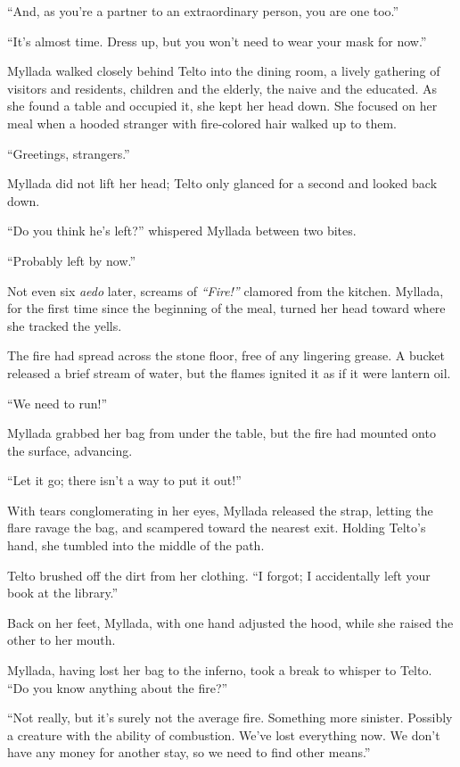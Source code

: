 ``And, as you're a partner to an extraordinary person, you are one too.''

``It's almost time. Dress up, but you won't need to wear your mask for now.''

\centeredstars

Myllada walked closely behind Telto into the dining room, a lively gathering of visitors and residents, children and the elderly, the naive and the educated. As she found a table and occupied it, she kept her head down. She focused on her meal when a hooded stranger with fire-colored hair walked up to them.

``Greetings, strangers.''

Myllada did not lift her head; Telto only glanced for a second and looked back down.

``Do you think he's left?'' whispered Myllada between two bites.

``Probably left by now.''

Not even six \emph{aedo} later, screams of \emph{``Fire!''} clamored from the kitchen. Myllada, for the first time since the beginning of the meal, turned her head toward where she tracked the yells.

The fire had spread across the stone floor, free of any lingering grease. A bucket released a brief stream of water, but the flames ignited it as if it were lantern oil.

``We need to run!''

Myllada grabbed her bag from under the table, but the fire had mounted onto the surface, advancing.

``Let it go; there isn't a way to put it out!''

With tears conglomerating in her eyes, Myllada released the strap, letting the flare ravage the bag, and scampered toward the nearest exit. Holding Telto's hand, she tumbled into the middle of the path.

Telto brushed off the dirt from her clothing. ``I forgot; I accidentally left your book at the library.''

Back on her feet, Myllada, with one hand adjusted the hood, while she raised the other to her mouth.

\centeredstars

Myllada, having lost her bag to the inferno, took a break to whisper to Telto. ``Do you know anything about the fire?''

``Not really, but it's surely not the average fire. Something more sinister. Possibly a creature with the ability of combustion. We've lost everything now. We don't have any money for another stay, so we need to find other means.''

